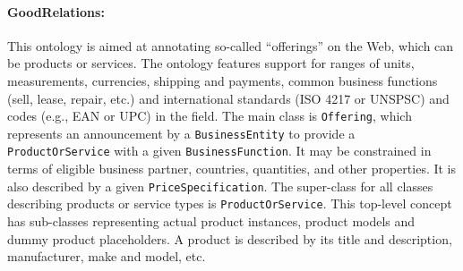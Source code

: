 \paragraph{GoodRelations:}
This ontology is aimed at annotating so-called ``offerings'' on the Web, which can be products or services. The ontology features support for ranges of units, measurements, currencies,  shipping and payments, common business functions (sell, lease, repair, etc.) and international standards (ISO 4217 or UNSPSC) and codes (e.g., EAN or UPC) in the field.
The main class is \texttt{Offering},
which represents an announcement by a \texttt{BusinessEntity} to provide a \texttt{ProductOrService} with a given \texttt{BusinessFunction}. It may be constrained in terms of eligible business partner, countries, quantities, and other properties. It is also described by a given \texttt{PriceSpecification}. The super-class for all classes describing products or service types is \texttt{ProductOrService}. This top-level concept has sub-classes representing actual product instances, product models and dummy product placeholders. A product is described by its title and description, manufacturer, make and model, etc. 


% 
% 
% 
% 


